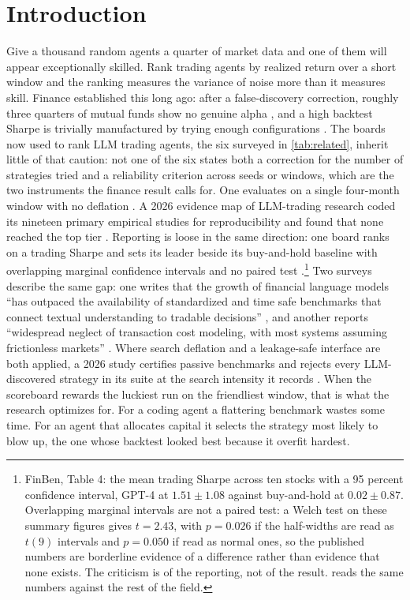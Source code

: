 \section{Introduction}\label{sec:intro}

Give a thousand random agents a quarter of market data and one of them will appear exceptionally skilled. Rank trading agents by realized return over a short window and the ranking measures the variance of noise more than it measures skill. Finance established this long ago: after a false-discovery correction, roughly three quarters of mutual funds show no genuine alpha \citep{barras2010false}, and a high backtest Sharpe is trivially manufactured by trying enough configurations \citep{bailey2014pseudo}. The boards now used to rank LLM trading agents, the six surveyed in \cref{tab:related}, inherit little of that caution: not one of the six states both a correction for the number of strategies tried and a reliability criterion across seeds or windows, which are the two instruments the finance result calls for. One evaluates on a single four-month window with no deflation \citep{stockbench2025}. A 2026 evidence map of LLM-trading research coded its nineteen primary empirical studies for reproducibility and found that none reached the top tier \citep{llmtradingaudit2026}. Reporting is loose in the same direction: one board ranks on a trading Sharpe and sets its leader beside its buy-and-hold baseline with overlapping marginal confidence intervals and no paired test \citep{finben2024}.\footnote{FinBen, Table 4: the mean trading Sharpe across ten stocks with a 95 percent confidence interval, GPT-4 at $1.51 \pm 1.08$ against buy-and-hold at $0.02 \pm 0.87$. Overlapping marginal intervals are not a paired test: a Welch test on these summary figures gives $t = 2.43$, with $p = 0.026$ if the half-widths are read as $t(9)$ intervals and $p = 0.050$ if read as normal ones, so the published numbers are borderline evidence of a difference rather than evidence that none exists. The criticism is of the reporting, not of the result.  reads the same numbers against the rest of the field.} Two surveys describe the same gap: one writes that the growth of financial language models ``has outpaced the availability of standardized and time safe benchmarks that connect textual understanding to tradable decisions'' \citep[p.~11]{fu2025newquant}, and another reports ``widespread neglect of transaction cost modeling, with most systems assuming frictionless markets'' \citep[p.~28]{cao2025deeplearning}. Where search deflation and a leakage-safe interface are both applied, a 2026 study certifies passive benchmarks and rejects every LLM-discovered strategy in its suite at the search intensity it records \citep[p.~13]{gencay2026survives}. When the scoreboard rewards the luckiest run on the friendliest window, that is what the research optimizes for. For a coding agent a flattering benchmark wastes some time. For an agent that allocates capital it selects the strategy most likely to blow up, the one whose backtest looked best because it overfit hardest.

